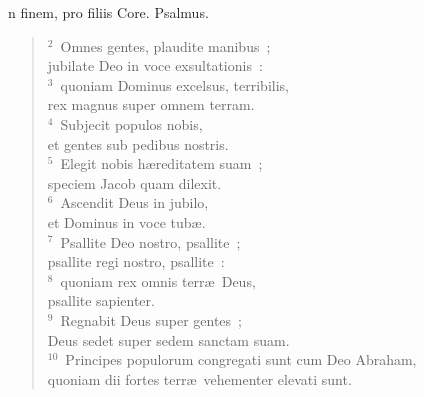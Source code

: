 \bchapter[Psalm]
n finem, pro filiis Core. Psalmus.
\begin{verse}${}^{2}$~Omnes gentes, plaudite manibus~;\\ jubilate Deo in voce exsultationis~:\\
${}^{3}$~quoniam Dominus excelsus, terribilis,\\ rex magnus super omnem terram.\\
${}^{4}$~Subjecit populos nobis,\\ et gentes sub pedibus nostris.\\
${}^{5}$~Elegit nobis h\ae reditatem suam~;\\ speciem Jacob quam dilexit.\\
${}^{6}$~Ascendit Deus in jubilo,\\ et Dominus in voce tub\ae .\\
${}^{7}$~Psallite Deo nostro, psallite~;\\ psallite regi nostro, psallite~:\\
${}^{8}$~quoniam rex omnis terr\ae\ Deus,\\ psallite sapienter.\\
${}^{9}$~Regnabit Deus super gentes~;\\ Deus sedet super sedem sanctam suam.\\
${}^{10}$~Principes populorum congregati sunt cum Deo Abraham,\\ quoniam dii fortes terr\ae\ vehementer elevati sunt.\end{verse}



